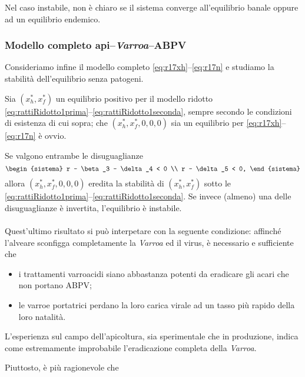 Nel caso instabile, non è chiaro se il sistema converge all'equilibrio banale oppure ad un equilibrio endemico. \cite[15]{ratti2017}


\subsubsection{Modello completo api--\emph{Varroa}--ABPV}
Consideriamo infine il modello completo \eqref{eq:r17xh}--\eqref{eq:r17n} e studiamo la stabilità dell'equilibrio senza patogeni.

Sia $(x_h^*, x_f^*)$ un equilibrio positivo per il modello ridotto \eqref{eq:rattiRidotto1prima}--\eqref{eq:rattiRidotto1seconda}, sempre secondo le condizioni di esistenza di cui sopra; che $(x_h^*, x_f^*, 0,0,0)$ sia un equilibrio per \eqref{eq:r17xh}--\eqref{eq:r17n} è ovvio.

Se valgono entrambe le disuguaglianze
$$
\begin{sistema}
    r - \beta_3 - \delta_4 < 0 \\
    r - \delta_5 < 0,
\end{sistema}
$$
allora $(x_h^*, x_f^*, 0,0,0)$ eredita la stabilità di $(x_h^*, x_f^*)$ sotto le \eqref{eq:rattiRidotto1prima}--\eqref{eq:rattiRidotto1seconda}.
Se invece (almeno) una delle disuguaglianze è invertita, l'equilibrio è instabile.

\paragraph{}
Quest'ultimo risultato si può interpetare con la seguente condizione: affinché l'alveare sconfigga completamente la \emph{Varroa} ed il virus, è necessario e sufficiente che
\begin{itemize}
    \item i trattamenti varroacidi siano abbastanza potenti da eradicare gli acari che non portano ABPV;
    \item le varroe portatrici perdano la loro carica virale ad un tasso più rapido della loro natalità.
\end{itemize}

L'esperienza sul campo dell'apicoltura, sia sperimentale che in produzione, indica come estremamente improbabile l'eradicazione completa della \emph{Varroa}.~\cite{privFPan}

Piuttosto, è più ragionevole che 

